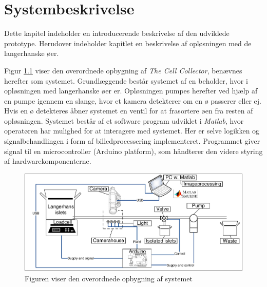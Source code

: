 \chapter{Systembeskrivelse}
Dette kapitel indeholder en introducerende beskrivelse af den udviklede prototype. Herudover indeholder kapitlet en beskrivelse af opløsningen med de langerhanske øer.

Figur \ref{fig:system} viser den overordnede opbygning af \textit{The Cell Collector}, benævnes herefter som systemet. Grundlæggende består systemet af en beholder, hvor i opløsningen med langerhanske øer er. Opløsningen pumpes herefter ved hjælp af en pumpe igennem en slange, hvor et kamera detekterer om en ø passerer eller ej. Hvis en ø detekteres åbner systemet en ventil for at frasortere øen fra resten af opløsningen. Systemet består af et software program udviklet i \textit{Matlab}, hvor operatøren har mulighed for at interagere med systemet. Her er selve logikken og signalbehandlingen i form af billedprocessering implementeret. Programmet giver signal til en microcontroller (Arduino platform), som håndterer den videre styring af hardwarekomponenterne.

\begin{figure}[H]
	\centering
	\includegraphics[width=1\textwidth]{billeder/DMTS.pdf}
	\caption{Figuren viser den overordnede opbygning af systemet}
	\label{fig:system}
\end{figure}
%
%


